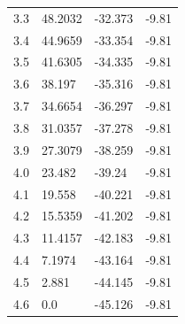\begin{tabular}{llll}
3.3 & 48.2032 & -32.373 & -9.81 \\
3.4 & 44.9659 & -33.354 & -9.81 \\
3.5 & 41.6305 & -34.335 & -9.81 \\
3.6 & 38.197 & -35.316 & -9.81 \\
3.7 & 34.6654 & -36.297 & -9.81 \\
3.8 & 31.0357 & -37.278 & -9.81 \\
3.9 & 27.3079 & -38.259 & -9.81 \\
4.0 & 23.482 & -39.24 & -9.81 \\
4.1 & 19.558 & -40.221 & -9.81 \\
4.2 & 15.5359 & -41.202 & -9.81 \\
4.3 & 11.4157 & -42.183 & -9.81 \\
4.4 & 7.1974 & -43.164 & -9.81 \\
4.5 & 2.881 & -44.145 & -9.81 \\
4.6 & 0.0 & -45.126 & -9.81 \\
\bottomrule
\end{tabular}
